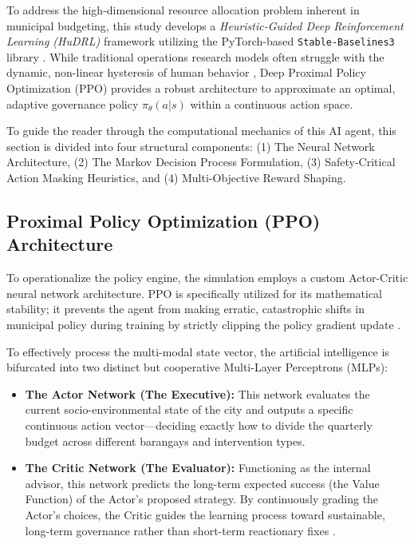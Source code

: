 To address the high-dimensional resource allocation problem inherent in municipal budgeting, this study develops a \textit{Heuristic-Guided Deep Reinforcement Learning (HuDRL)} framework utilizing the PyTorch-based \texttt{Stable-Baselines3} library \citep{Raffin2021}. While traditional operations research models often struggle with the dynamic, non-linear hysteresis of human behavior \citep{Saif2022}, Deep Proximal Policy Optimization (PPO) provides a robust architecture to approximate an optimal, adaptive governance policy $\pi_\theta(a|s)$ within a continuous action space. 

To guide the reader through the computational mechanics of this AI agent, this section is divided into four structural components: (1) The Neural Network Architecture, (2) The Markov Decision Process Formulation, (3) Safety-Critical Action Masking Heuristics, and (4) Multi-Objective Reward Shaping.

\subsection{Proximal Policy Optimization (PPO) Architecture}

To operationalize the policy engine, the simulation employs a custom Actor-Critic neural network architecture. PPO is specifically utilized for its mathematical stability; it prevents the agent from making erratic, catastrophic shifts in municipal policy during training by strictly clipping the policy gradient update \citep{Raffin2021}. 

To effectively process the multi-modal state vector, the artificial intelligence is bifurcated into two distinct but cooperative Multi-Layer Perceptrons (MLPs):
\begin{itemize}
    \item \textbf{The Actor Network (The Executive):} This network evaluates the current socio-environmental state of the city and outputs a specific continuous action vector—deciding exactly how to divide the quarterly budget across different barangays and intervention types.
    \item \textbf{The Critic Network (The Evaluator):} Functioning as the internal advisor, this network predicts the long-term expected success (the Value Function) of the Actor's proposed strategy. By continuously grading the Actor's choices, the Critic guides the learning process toward sustainable, long-term governance rather than short-term reactionary fixes \citep{Mousavi2021}.
\end{itemize}

